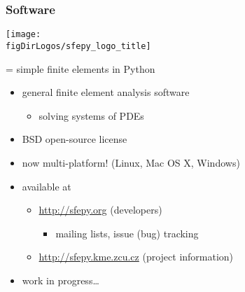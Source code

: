 \begin{frame}
  \frametitle{Software}
  \begin{flushleft}
    \begin{minipage}{0.5\linewidth}
      \texttt{[image: \\figDirLogos/sfepy\_logo\_title]}
    \end{minipage}
     = simple finite elements in Python
  \end{flushleft}
  \begin{itemize}
  \item general finite element analysis software
    \begin{itemize}
    \item solving systems of PDEs
    \end{itemize}
  \item<1-> BSD open-source license
  \item<1-> now multi-platform! (Linux, Mac OS X, Windows)
  \item<1-> available at
    \begin{itemize}
    \item 
      \href{http://sfepy.org}{\url{http://sfepy.org}} (developers)
      \begin{itemize}
      \item mailing lists, issue (bug) tracking
      \end{itemize}
    \item \href{http://sfepy.kme.zcu.cz}{\url{http://sfepy.kme.zcu.cz}}
      (project information)
    \end{itemize}
  \item work in progress\dots
  \end{itemize}
\end{frame}
